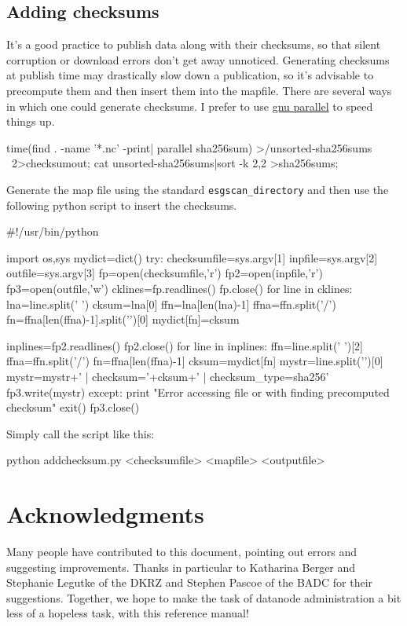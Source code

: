 \subsection{Adding checksums}
It's a good practice to publish data along with their checksums, so that silent corruption or download errors don't get away unnoticed. Generating checksums at publish time may drastically slow down a publication, so it's advisable to precompute them and then insert them into the mapfile. There are several ways in which one could generate checksums. I prefer to use \href{http://www.gnu.org/software/parallel}{gnu parallel} to speed things up.
\begin{verbatimtab}
time(find . -name '*.nc' -print| parallel sha256sum) >/unsorted-sha256sums \
2>checksumout;
cat unsorted-sha256sums|sort -k 2,2 >sha256sums;
\end{verbatimtab}
Generate the map file using the standard \texttt{esgscan\_directory} and then use the following python script to insert the checksums.
\begin{verbatimtab}
#!/usr/bin/python

import os,sys
mydict=dict()
try:
    checksumfile=sys.argv[1]
    inpfile=sys.argv[2]
    outfile=sys.argv[3]
    fp=open(checksumfile,'r')
    fp2=open(inpfile,'r')
    fp3=open(outfile,'w')
    cklines=fp.readlines()
    fp.close()
    for line in cklines:
        lna=line.split(' ')
        cksum=lna[0]
        ffn=lna[len(lna)-1]
        ffna=ffn.split('/')
        fn=ffna[len(ffna)-1].split('\n')[0]
        mydict[fn]=cksum

    inplines=fp2.readlines()
    fp2.close()
    for line in inplines:
        ffn=line.split(' ')[2]
        ffna=ffn.split('/')
        fn=ffna[len(ffna)-1]
        cksum=mydict[fn]
        mystr=line.split('\n')[0]
        mystr=mystr+' | checksum='+cksum+' | checksum_type=sha256\n'
        fp3.write(mystr)
except:
    print "Error accessing file or with finding precomputed checksum"
    exit()
fp3.close()
\end{verbatimtab}
Simply call the script like this:
\begin{verbatimtab}
python addchecksum.py <checksumfile> <mapfile> <outputfile>
\end{verbatimtab}
\section{Acknowledgments}
Many people have contributed to this document, pointing out errors and suggesting improvements. Thanks in particular to Katharina Berger and Stephanie Legutke of the DKRZ and Stephen Pascoe of the BADC for their suggestions.  Together, we hope to make the task of datanode administration a bit less of a hopeless task, with this reference manual!
